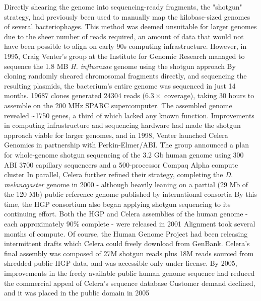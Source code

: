 Directly shearing the genome into sequencing-ready fragments, the "shotgun" strategy, had previously been used to manually map the kilobase-sized genomes of several bacteriophages. This method was deemed unsuitable for larger genomes due to the sheer number of reads required, an amount of data that would not have been possible to align on early 90s computing infrastructure. However, in 1995, Craig Venter's group at the Institute for Genomic Research managed to sequence the 1.8 MB \textit{H. influenzae} genome using the shotgun approach By cloning randomly sheared chromosomal fragments directly, and sequencing the resulting plasmids, the bacterium's entire genome was sequenced in just 14 months. \num{19687} clones generated \num{24304} reads ($6.3\times$ coverage), taking 30 hours to assemble on the 200 MHz SPARC supercomputer. The assembled genome revealed \textasciitilde\num{1750} genes, a third of which lacked any known function. Improvements in computing infrastructure and sequencing hardware had made the shotgun approach viable for larger genomes, and in 1998, Venter launched Celera Genomics in partnership with Perkin-Elmer/ABI. The group announced a plan for whole-genome shotgun sequencing of the 3.2 Gb human genome using 300 ABI 3700 capillary sequencers and a 500-processor Compaq Alpha compute cluster In parallel, Celera further refined their strategy, completing the \textit{D. melanogaster} genome in 2000 - although heavily leaning on a partial (29 Mb of the 120 Mb) public reference genome published by international consortia By this time, the HGP consortium also began applying shotgun sequencing to its continuing effort. Both the HGP and Celera assemblies of the human genome - each approximately 90\% complete - were released in 2001 Alignment took several months of compute. Of course, the Human Genome Project had been releasing intermittent drafts which Celera could freely download from GenBank. Celera's final assembly was composed of 27M shotgun reads plus 18M reads sourced from shredded public HGP data, and was accessible only under license. By 2005, improvements in the freely available public human genome sequence had reduced the commercial appeal of Celera's sequence database Customer demand declined, and it was placed in the public domain in 2005


